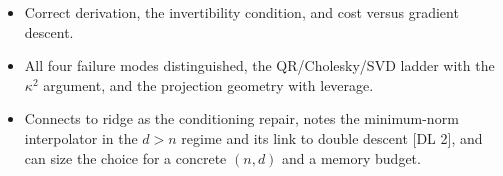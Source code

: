 \begin{interviewq}

\goodgreat
\begin{itemize}
    \item {} Correct derivation, the invertibility condition, and cost versus gradient descent.
    \item {} All four failure modes distinguished, the QR/Cholesky/SVD ladder with the $\kappa^2$ argument, and the projection geometry with leverage.
    \item {} Connects to ridge as the conditioning repair, notes the minimum-norm interpolator in the $d>n$ regime and its link to double descent [DL 2], and can size the choice for a concrete $(n,d)$ and a memory budget.
\end{itemize}

\end{interviewq}

